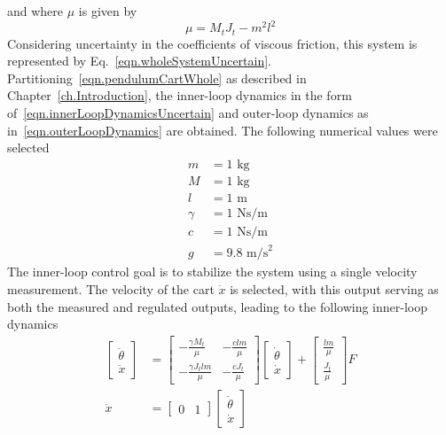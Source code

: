 and where $\mu$ is given by
\begin{equation*}
  \mu = M_{t}J_{t} - m^{2}l^{2}
\end{equation*}
Considering uncertainty in the coefficients of viscous friction, this system is represented by Eq.\ \eqref{eqn.wholeSystemUncertain}.
Partitioning\ \eqref{eqn.pendulumCartWhole} as described in Chapter~\ref{ch.Introduction}, the inner-loop dynamics in the form of\ \eqref{eqn.innerLoopDynamicsUncertain} and outer-loop dynamics as in\ \eqref{eqn.outerLoopDynamics} are obtained.
The following numerical values were selected
\begin{equation}
  \label{eqn.pendulumNumericalValues}
  \begin{aligned}
    m &= 1 \text{~kg} \\
    M &= 1 \text{~kg} \\
    l &= 1 \text{~m} \\
    \gamma &= 1 \text{~Ns/m} \\
    c &= 1 \text{~Ns/m} \\
    g &= 9.8 \text{~m/s}^2
  \end{aligned}
\end{equation}
The inner-loop control goal is to stabilize the system using a single velocity measurement.
The velocity of the cart $\dot{x}$ is selected, with this output serving as both the measured and regulated outputs, leading to the following inner-loop dynamics
\begin{equation}
  \label{eqn.pendulumCartInnerLoop}
  \begin{split}
    \begin{bmatrix}
      \ddot{\theta} \\
      \ddot{x}
    \end{bmatrix}
    &=
    \begin{bmatrix}
      -\frac{\gamma M_{t}}{\mu} & -\frac{cl m}{\mu} \\
      -\frac{\gamma J_{t}l m}{\mu} & -\frac{cJ_{t}}{\mu}
    \end{bmatrix}
    \begin{bmatrix}
      \dot{\theta} \\
      \dot{x}
    \end{bmatrix}
    +
    \begin{bmatrix}
      \frac{l m}{\mu} \\
      \frac{J_{t}}{\mu}
    \end{bmatrix}
    F \\
    \dot{x}
    &=
    \begin{bmatrix}
      0 & 1
    \end{bmatrix}
    \begin{bmatrix}
      \dot{\theta} \\
      \dot{x}
    \end{bmatrix}
  \end{split}
\end{equation}
